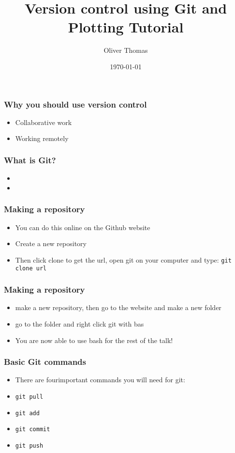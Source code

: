 \documentclass{beamer}
\title{Version control using Git and Plotting Tutorial}
\author{Oliver Thomas}
\institute{Quantum Engineering CDT \\ University of Bristol}
\date{\today}
\begin{document}
\frame{\titlepage}

\begin{frame}
\frametitle{Why you should use version control}
\begin{itemize}
\item Collaborative work  
\item Working remotely
\end{itemize}
\end{frame}

\begin{frame}
\frametitle{What is Git?}
\begin{itemize}
\item  
\item
\end{itemize}
\end{frame}

\begin{frame}
\frametitle{Making a repository}
\begin{itemize}
\item You can do this online on the Github website   
\item Create a new repository
\item Then click clone to get the url, open git on your computer and type: 
	\texttt{git clone url}
\end{itemize}
\end{frame}

\begin{frame}
\frametitle{Making a repository}
\begin{itemize}
\item make a new repository, then go to the website and make a new folder 
\item go to the folder and right click git with bas
\item You are now able to use bash for the rest of the talk!
\end{itemize}
\end{frame}


\begin{frame}
\frametitle{Basic Git commands}
\begin{itemize}
	\item There are four\footnotemark important commands you will need for git:
	\item \texttt{git pull}
	\item \texttt{git add}
	\item \texttt{git commit}
	\item \texttt{git push}
\end{itemize}
\end{frame}
\end{document}
